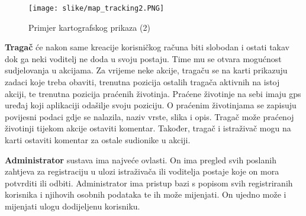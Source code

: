 		\begin{figure}[H]
			\texttt{[image: slike/map\_tracking2.PNG]} %
			\centering
			\caption{Primjer kartografskog prikaza (2)}
			\label{fig:promjene}
		\end{figure}
		
		\textbf{Tragač} će nakon same kreacije korisničkog računa biti slobodan i ostati takav dok ga neki voditelj ne doda u svoju postaju. Time mu se otvara mogućnost sudjelovanja u akcijama. Za vrijeme neke akcije, tragaču se na karti prikazuju zadaci koje treba obaviti, trenutna pozicija ostalih tragača aktivnih na istoj akciji, te trenutna pozicija praćenih životinja. Praćene životinje na sebi imaju gps uređaj koji aplikaciji odašilje svoju poziciju. O
		praćenim životinjama se zapisuju povijesni podaci gdje se nalazila, naziv vrste, slika i opis. Tragač može praćenoj životinji tijekom akcije ostaviti komentar. Također, tragač i istraživač mogu na karti ostaviti komentar za ostale sudionike u akciji.		
		
		\textbf{Administrator} sustava ima najveće ovlasti. On ima pregled svih poslanih zahtjeva za registraciju u ulozi istraživača ili voditelja postaje koje on mora potvrditi ili odbiti. Administrator ima pristup bazi s popisom svih registriranih korisnika i njihovih osobnih podataka te ih može mijenjati. On ujedno može i mijenjati ulogu dodijeljenu korisniku.